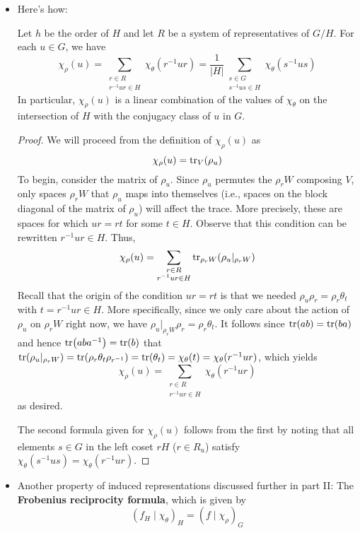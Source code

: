 \documentclass[../notes.tex]{subfiles}
\begin{document}
\begin{itemize}
    \item Here's how:
    \begin{theorem}\label{trm:induceChi}
        Let $h$ be the order of $H$ and let $R$ be a system of representatives of $G/H$. For each $u\in G$, we have
        \begin{equation*}
            \chi_\rho(u) = \sum_{\substack{r\in R\\r^{-1}ur\in H}}\chi_\theta(r^{-1}ur)
            = \frac{1}{|H|}\sum_{\substack{s\in G\\s^{-1}us\in H}}\chi_\theta(s^{-1}us)
        \end{equation*}
        In particular, $\chi_\rho(u)$ is a linear combination of the values of $\chi_\theta$ on the intersection of $H$ with the conjugacy class of $u$ in $G$.
        \begin{proof}
            We will proceed from the definition of $\chi_\rho(u)$ as
            \begin{equation*}
                \chi_\rho(u) = \tr_V(\rho_u)
            \end{equation*}
            To begin, consider the matrix of $\rho_u$. Since $\rho_u$ permutes the $\rho_rW$ composing $V$, only spaces $\rho_rW$ that $\rho_u$ maps into themselves (i.e., spaces on the block diagonal of the matrix of $\rho_u$) will affect the trace. More precisely, these are spaces for which $ur=rt$ for some $t\in H$. Observe that this condition can be rewritten $r^{-1}ur\in H$. Thus,
            \begin{equation*}
                \chi_\rho(u) = \sum_{\substack{r\in R\\r^{-1}ur\in H}}\tr_{\rho_rW}(\rho_u|_{\rho_rW})
            \end{equation*}
            Recall that the origin of the condition $ur=rt$ is that we needed $\rho_u\rho_r=\rho_r\theta_t$ with $t=r^{-1}ur\in H$. More specifically, since we only care about the action of $\rho_u$ on $\rho_rW$ right now, we have $\rho_u|_{\rho_rW}\rho_r=\rho_r\theta_t$. It follows since $\tr(ab)=\tr(ba)$ and hence $\tr(aba^{-1})=\tr(b)$ that $\tr(\rho_u|_{\rho_rW})=\tr(\rho_r\theta_t\rho_{r^{-1}})=\tr(\theta_t)=\chi_\theta(t)=\chi_\theta(r^{-1}ur)$, which yields
            \begin{equation*}
                \chi_\rho(u) = \sum_{\substack{r\in R\\r^{-1}ur\in H}}\chi_\theta(r^{-1}ur)
            \end{equation*}
            as desired.\par
            The second formula given for $\chi_\rho(u)$ follows from the first by noting that all elements $s\in G$ in the left coset $rH$ ($r\in R_u$) satisfy $\chi_\theta(s^{-1}us)=\chi_\theta(r^{-1}ur)$.
        \end{proof}
    \end{theorem}
    \item Another property of induced representations discussed further in part II: The \textbf{Frobenius reciprocity formula}, which is given by
    \begin{equation*}
        (f_H\mid\chi_\theta)_H = (f\mid\chi_\rho)_G
    \end{equation*}
\end{itemize}
\end{document}
